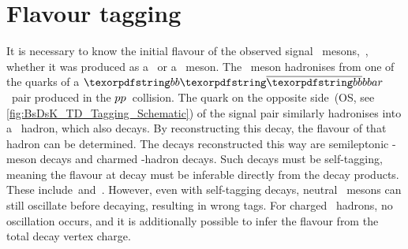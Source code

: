 \section{Flavour tagging} \label{sec:BsDsK_TD_Tagging}
It is necessary to know the initial flavour of the observed signal \Bs~mesons,~\ie, whether it was produced as a \Bs~or a \Bsb~meson.
The \BsorBsb~meson hadronises from one of the quarks of a \({\bquark\bquarkbar}\)~pair produced in the \({{p}{p}}\)~collision.
The quark on the opposite side~(OS, see \cref{fig:BsDsK_TD_Tagging_Schematic}) of the signal pair similarly hadronises into a \bquark~hadron, which also decays.
By reconstructing this decay, the flavour of that hadron can be determined.
The decays reconstructed this way are semileptonic \bquark-meson decays and charmed \bquark-hadron decays.
Such decays must be self-tagging, meaning the flavour at decay must be inferable directly from the decay products.
These include~\BdDmunu and~\BpJpsiK.
However, even with self-tagging decays, neutral \bquark~mesons can still oscillate before decaying, resulting in wrong tags.
For charged \bquark~hadrons, no oscillation occurs, and it is additionally possible to infer the flavour from the total decay vertex charge.
%
